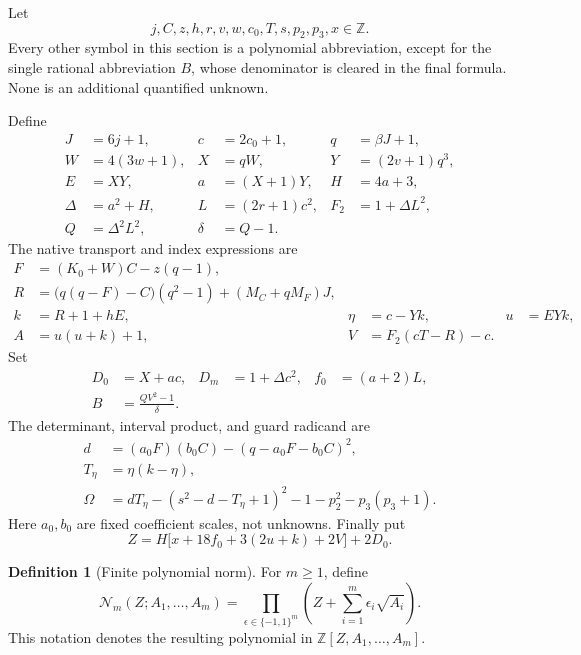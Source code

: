 \documentclass[11pt]{article}
\theoremstyle{definition}
\newtheorem{definition}[theorem]{Definition}
\theoremstyle{remark}
\newcommand{\Z}{\mathbb Z}
\newcommand{\Norm}{\mathcal N}
\begin{document}
Let
\[
 \boxed{j,C,z,h,r,v,w,c_0,T,s,p_2,p_3,x\in\Z.}
 \label{eq:variables}
\]
Every other symbol in this section is a polynomial abbreviation, except
for the single rational abbreviation \(B\), whose denominator is cleared
in the final formula. None is an additional quantified unknown.

Define
\begin{align}
 J&=6j+1,& c&=2c_0+1,& q&=\beta J+1,\nonumber\\
 W&=4(3w+1),& X&=qW,& Y&=(2v+1)q^3,\label{eq:basic}\\
 E&=XY,& a&=(X+1)Y,& H&=4a+3,\nonumber\\
 \Delta&=a^2+H,& L&=(2r+1)c^2,& F_2&=1+\Delta L^2,\nonumber\\
 Q&=\Delta^2L^2,& \delta&=Q-1.&&\nonumber
\end{align}
The native transport and index expressions are
\begin{align}
 F&=(K_0+W)C-z(q-1),\label{eq:transport}\\
 R&=\bigl(q(q-F)-C\bigr)(q^2-1)+(M_C+qM_F)J,\nonumber\\
 k&=R+1+hE,& \eta&=c-Yk,& u&=EYk,\label{eq:rank}\\
 A&=u(u+k)+1,& V&=F_2(cT-R)-c.&&\nonumber
\end{align}
Set
\begin{align}
 D_0&=X+ac,& D_m&=1+\Delta c^2,&
 f_0&=(a+2)L,\label{eq:mainabbrev}\\
 B&=\frac{QV^2-1}{\delta}.&&&&\nonumber
\end{align}
The determinant, interval product, and guard radicand are
\begin{align}
 d&=(a_0F)(b_0C)-(q-a_0F-b_0C)^2,\label{eq:det}\\
 T_\eta&=\eta(k-\eta),\nonumber\\
 \Omega&=dT_\eta-(s^2-d-T_\eta+1)^2
                   -1-p_2^2-p_3(p_3+1).\label{eq:omega}
\end{align}
Here \(a_0,b_0\) are fixed coefficient scales, not unknowns. Finally put
\begin{equation}
 Z=H\bigl[x+18f_0+3(2u+k)+2V\bigr]+2D_0.
 \label{eq:carrier}
\end{equation}

\begin{definition}[Finite polynomial norm]\label{def:norm}
For \(m\ge1\), define
\[
 \Norm_m(Z;A_1,\ldots,A_m)
 =\prod_{\epsilon\in\{-1,1\}^m}
       \left(Z+\sum_{i=1}^m\epsilon_i\sqrt{A_i}\right).
\]
This notation denotes the resulting polynomial in
\(\Z[Z,A_1,\ldots,A_m]\).
\end{definition}
\end{document}
